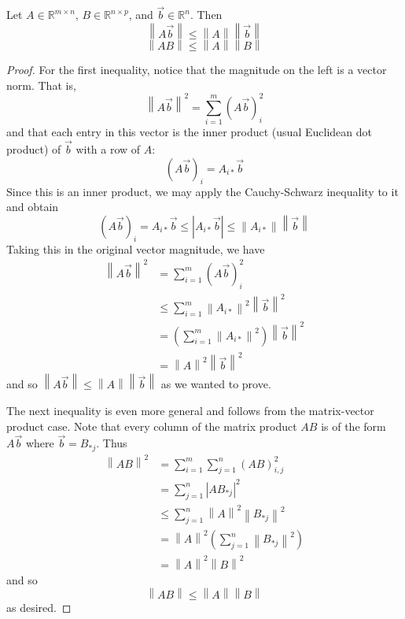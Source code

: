 \begin{prop}
Let $A \in \mathbb{R}^{m\times n}$, $B \in \mathbb{R}^{n \times p}$, and $\vec{b} \in \mathbb{R}^n$. Then \[ \left\lVert A\vec{b}\right\rVert \leq \left\lVert A \right\rVert \left\lVert \vec{b} \right\rVert \] \[ \left\lVert AB\right\rVert \leq \left\lVert A \right\rVert \left\lVert B \right\rVert \]
\end{prop}
\begin{proof}
For the first inequality, notice that the magnitude on the left is a vector norm. That is, \[ \left\lVert A\vec{b}\right\rVert^2 = \sum_{i=1}^m \left(A\vec{b}\right)^2_i  \] and that each entry in this vector is the inner product (usual Euclidean dot product) of $\vec{b}$ with a row of $A$: \[ \left(A\vec{b}\right)_i = A_{i*}\vec{b} \] Since this is an inner product, we may apply the Cauchy-Schwarz inequality to it and obtain \[  \left(A\vec{b}\right)_i = A_{i*}\vec{b} \leq \left| A_{i*}\vec{b}  \right| \leq \left\lVert A_{i*} \right\rVert \left\lVert \vec{b} \right\rVert \] Taking this in the original vector magnitude, we have 
\begin{align*}
	\left\lVert A\vec{b} \right\rVert^2  & = \sum_{i=1}^m \left( A\vec{b}\right)^2_i \\
	& \leq \sum_{i=1}^m \left\lVert A_{i*} \right\rVert^2 \left\lVert \vec{b} \right\rVert^2 \\
	& = \left( \sum_{i=1}^m \left\lVert A_{i*} \right\rVert^2 \right) \left\lVert \vec{b}\right\rVert^2 \\
	& = \left\lVert A \right\rVert^2 \left\lVert \vec{b} \right\rVert^2
\end{align*}
and so $\left\lVert A\vec{b}\right\rVert \leq \left\lVert A \right\rVert \left\lVert \vec{b} \right\rVert$ as we wanted to prove.

The next inequality is even more general and follows from the matrix-vector product case. Note that every column of the matrix product $AB$ is of the form $A\vec{b}$ where $\vec{b} = B_{*j}$. Thus
\begin{align*}
	\left\lVert AB \right\rVert^2 & = \sum_{i=1}^m \sum_{j=1}^n \left(AB\right)_{i,j}^2 \\
	& = \sum_{j=1}^n \left| A B_{*j} \right|^2 \\
	& \leq \sum_{j=1}^n \left\lVert A \right\rVert^2 \left\lVert B_{*j}\right\rVert^2 \\
	& = \left\lVert A \right\rVert^2 \left( \sum_{j=1}^n \left\lVert B_{*j} \right\rVert^2 \right) \\ 
	& = \left\lVert A \right\rVert^2 \left\lVert B \right\rVert^2
\end{align*}
and so \[ \left\lVert AB \right\rVert \leq \left\lVert A \right\rVert \left\lVert B \right\rVert \] as desired.


\end{proof}


